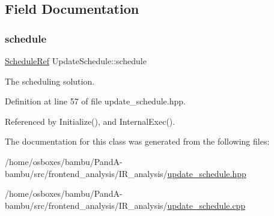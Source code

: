 \subsection{Field Documentation}
\mbox{\label{classUpdateSchedule_a5f2155d3a69907ff51bec7b73da62055}} 
\subsubsection{\texorpdfstring{schedule}{schedule}}
{\footnotesize\ttfamily \hyperlink{schedule_8hpp_af67f402958b3b52a1ec5cc4ce08ae3b9}{Schedule\+Ref} Update\+Schedule\+::schedule\hspace{0.3cm}{\ttfamily [protected]}}



The scheduling solution. 



Definition at line 57 of file update\+\_\+schedule.\+hpp.



Referenced by Initialize(), and Internal\+Exec().



The documentation for this class was generated from the following files\+:\begin{DoxyCompactItemize}
\item 
/home/osboxes/bambu/\+Pand\+A-\/bambu/src/frontend\+\_\+analysis/\+I\+R\+\_\+analysis/\hyperlink{update__schedule_8hpp}{update\+\_\+schedule.\+hpp}\item 
/home/osboxes/bambu/\+Pand\+A-\/bambu/src/frontend\+\_\+analysis/\+I\+R\+\_\+analysis/\hyperlink{update__schedule_8cpp}{update\+\_\+schedule.\+cpp}\end{DoxyCompactItemize}
